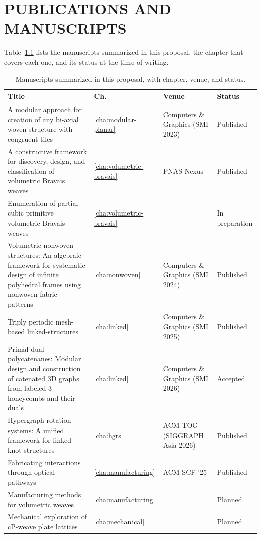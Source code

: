 \chapter{\uppercase{Publications and Manuscripts}}
\label{app:publications}

Table~\ref{tab:pubs} lists the manuscripts summarized in this proposal, the chapter that covers each one, and its status at the time of writing.

\begin{table}[htbp]
\centering
\begin{singlespace}
\footnotesize
\begin{tabular}{@{}>{\raggedright\arraybackslash}p{}>{\raggedright\arraybackslash}p{}>{\raggedright\arraybackslash}p{}>{\raggedright\arraybackslash}p{}@{}}
\toprule
\textbf{Title} & \textbf{Ch.} & \textbf{Venue} & \textbf{Status} \\
\midrule
A modular approach for creation of any bi-axial woven structure with congruent tiles~\cite{yildiz2023modular} & \ref{cha:modular-planar} & Computers \& Graphics (SMI 2023) & Published \\[3pt]
A constructive framework for discovery, design, and classification of volumetric Bravais weaves~\cite{yildiz2025volumetric} & \ref{cha:volumetric-bravais} & PNAS Nexus & Published \\[3pt]
Enumeration of partial cubic primitive volumetric Bravais weaves~\cite{akpanya2025enumeration} & \ref{cha:volumetric-bravais} & & In preparation \\[3pt]
Volumetric nonwoven structures: An algebraic framework for systematic design of infinite polyhedral frames using nonwoven fabric patterns~\cite{yildiz2024nonwoven} & \ref{cha:nonwoven} & Computers \& Graphics (SMI 2024) & Published \\[3pt]
Triply periodic mesh-based linked-structures~\cite{yildiz2025linked} & \ref{cha:linked} & Computers \& Graphics (SMI 2025) & Published \\[3pt]
Primal-dual polycatenanes: Modular design and construction of catenated 3D graphs from labeled 3-honeycombs and their duals~\cite{yildiz2026polycatenane} & \ref{cha:linked} & Computers \& Graphics (SMI 2026) & Accepted \\[3pt]
Hypergraph rotation systems: A unified framework for linked knot structures~\cite{yildiz2026hypergraph} & \ref{cha:hgrs} & ACM TOG (SIGGRAPH Asia 2026) & Published \\[3pt]
Fabricating interactions through optical pathways~\cite{deshpande2025optical} & \ref{cha:manufacturing} & ACM SCF '25 & Published \\[3pt]
Manufacturing methods for volumetric weaves & \ref{cha:manufacturing} & & Planned \\[3pt]
Mechanical exploration of cP-weave plate lattices & \ref{cha:mechanical} & & Planned \\
\bottomrule
\end{tabular}
\end{singlespace}
\caption{Manuscripts summarized in this proposal, with chapter, venue, and status.}
\label{tab:pubs}
\end{table}
